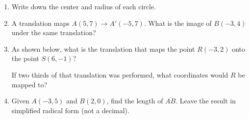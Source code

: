 \documentclass[12pt, twoside]{article}
\begin{document}
\begin{enumerate}
  \item Write down the center and radius of each circle.
    \begin{enumerate}
    \end{enumerate}  \vspace{2cm}


\newpage
  \item A translation maps $A(5,7) \rightarrow A'(-5,7)$. What is the image of $B(-3,4)$ under the same translation?  \vspace{2.5cm}

  \item As shown below, what is the translation that maps the point $R(-3,2)$ onto the point $S(6, -1)$?
    \begin{center} %
    \end{center}
    If two thirds of that translation was performed, what coordinates would $R$ be mapped to? \vspace{2cm}

  \item Given $A(-3,5)$ and $B(2,0)$, find the length of $\overline{AB}$. Leave the result in simplified radical form (not a decimal).
      \vspace{4cm}


  \end{enumerate}

  
\end{document}
